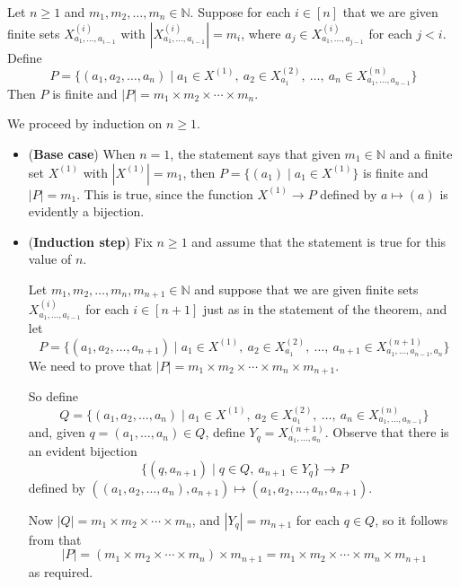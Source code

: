 \begin{theorem}
\label{thmMultPrinciple}
Let $n \ge 1$ and $m_1,m_2,\dots,m_n \in \mathbb{N}$. Suppose for each $i \in [n]$ that we are given finite sets $X^{(i)}_{a_1,\dots,a_{i-1}}$ with $|X^{(i)}_{a_1,\dots,a_{i-1}}| = m_i$, where $a_j \in X^{(i)}_{a_1,\dots,a_{j-1}}$ for each $j<i$. Define
\[ P = \{ (a_1,a_2,\dots,a_n) \mid a_1 \in X^{(1)}, ~ a_2 \in X^{(2)}_{a_1}, ~ \dots, ~ a_n \in X^{(n)}_{a_1,\dots,a_{n-1}} \} \]
Then $P$ is finite and $|P| = m_1 \times m_2 \times \cdots \times m_n$.
\end{theorem}

\begin{cproof}
We proceed by induction on $n \ge 1$.
\begin{itemize}
\item (\textbf{Base case}) When $n=1$, the statement says that given $m_1 \in \mathbb{N}$ and a finite set $X^{(1)}$ with $|X^{(1)}|=m_1$, then $P = \{ (a_1) \mid a_1 \in X^{(1)} \}$ is finite and $|P| = m_1$. This is true, since the function $X^{(1)} \to P$ defined by $a \mapsto (a)$ is evidently a bijection.

\item (\textbf{Induction step}) Fix $n \ge 1$ and assume that the statement is true for this value of $n$.

Let $m_1, m_2, \dots, m_n, m_{n+1} \in \mathbb{N}$ and suppose that we are given finite sets $X^{(i)}_{a_1,\dots,a_{i-1}}$ for each $i \in [n+1]$ just as in the statement of the theorem, and let
\[ P = \{ (a_1,a_2,\dots,a_{n+1}) \mid a_1 \in X^{(1)}, ~ a_2 \in X^{(2)}_{a_1}, ~ \dots, ~ a_{n+1} \in X^{(n+1)}_{a_1,\dots,a_{n-1},a_n} \} \]
We need to prove that $|P| = m_1 \times m_2 \times \cdots \times m_n \times m_{n+1}$.

So define
\[ Q = \{ (a_1,a_2,\dots,a_n) \mid a_1 \in X^{(1)}, ~ a_2 \in X^{(2)}_{a_1}, ~ \dots, ~ a_n \in X^{(n)}_{a_1,\dots,a_{n-1}} \} \]
and, given $q = (a_1,\dots,a_n) \in Q$, define $Y_q = X^{(n+1)}_{a_1,\dots,a_n}$. Observe that there is an evident bijection
\[ \{ (q,a_{n+1}) \mid q \in Q, ~ a_{n+1} \in Y_{q} \} \to P \]
defined by $((a_1,a_2,\dots,a_n),a_{n+1}) \mapsto (a_1,a_2,\dots,a_n,a_{n+1})$.

Now $|Q|=m_1 \times m_2 \times \cdots \times m_n$, and $|Y_q| = m_{n+1}$ for each $q \in Q$, so it follows from  that
\[ |P| = (m_1 \times m_2 \times \cdots \times m_n) \times m_{n+1} = m_1 \times m_2 \times \cdots \times m_n \times m_{n+1} \]
as required.
\end{itemize}
\end{cproof}

